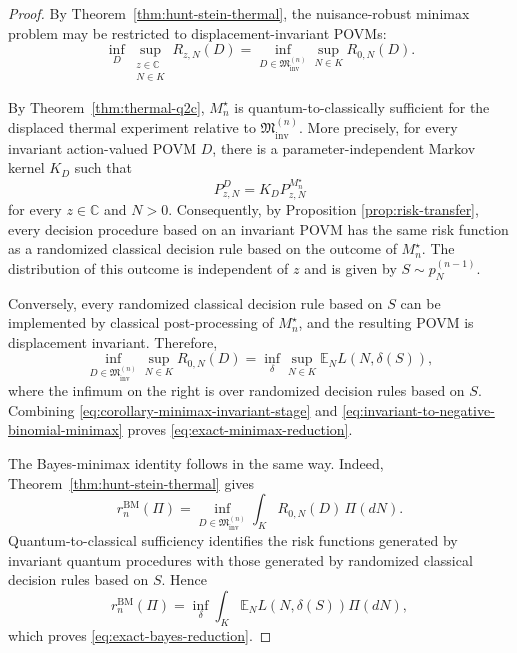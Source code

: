 \documentclass{article}
\theoremstyle{named}
\theoremstyle{named1}
\newcommand{\N}{\mathbb{N}}
\newcommand{\E}{\mathbb{E}}
\newcommand{\bbC}{\mathbb C}
\newcommand{\cM}{\mathfrak M}
\theoremstyle{plain}
\theoremstyle{remark}
\begin{document}
\begin{proof}
By Theorem~\ref{thm:hunt-stein-thermal}, the nuisance-robust minimax
problem may be restricted to displacement-invariant POVMs:
\begin{equation}
    \inf_D
    \sup_{\substack{z\in\bbC\\N\in K}}
    R_{z,N}(D)
    =
    \inf_{D\in\cM_{\mathrm{inv}}^{(n)}}
    \sup_{N\in K}
    R_{0,N}(D).
    \label{eq:corollary-minimax-invariant-stage}
\end{equation}

By Theorem~\ref{thm:thermal-q2c}, \(M_n^\star\) is
quantum-to-classically sufficient for the displaced thermal experiment
relative to \(\cM_{\mathrm{inv}}^{(n)}\). More precisely, for every
invariant action-valued POVM \(D\), there is a parameter-independent
Markov kernel \(K_D\) such that
\begin{equation}
    P_{z,N}^{D}
    =
    K_D P_{z,N}^{M_n^\star}
    \label{eq:thermal-risk-randomization}
\end{equation}
for every \(z\in\bbC\) and \(N>0\). Consequently, by Proposition \ref{prop:risk-transfer}, every decision
procedure based on an invariant POVM has the same risk function as a
randomized classical decision rule based on the outcome of \(M_n^\star\).
The distribution of this outcome is independent of \(z\) and is given by
$S\sim p_N^{(n-1)}.$


Conversely, every randomized classical decision rule based on \(S\) can
be implemented by classical post-processing of \(M_n^\star\), and the
resulting POVM is displacement invariant. Therefore,
\begin{equation}
    \inf_{D\in\cM_{\mathrm{inv}}^{(n)}}
    \sup_{N\in K}
    R_{0,N}(D)
    =
    \inf_{\delta}
    \sup_{N\in K}
    \E_N
    L\!\left(N,\delta(S)\right),
    \label{eq:invariant-to-negative-binomial-minimax}
\end{equation}
where the infimum on the right is over randomized decision rules based on
\(S\). Combining
\eqref{eq:corollary-minimax-invariant-stage} and
\eqref{eq:invariant-to-negative-binomial-minimax} proves
\eqref{eq:exact-minimax-reduction}.

The Bayes-minimax identity follows in the same way. Indeed,
Theorem~\ref{thm:hunt-stein-thermal} gives
\begin{equation}
    r_n^{\mathrm{BM}}(\Pi)
    =
    \inf_{D\in\cM_{\mathrm{inv}}^{(n)}}
    \int_K
        R_{0,N}(D)\,
        \Pi(dN).
    \label{eq:corollary-bayes-invariant-stage}
\end{equation}
Quantum-to-classical sufficiency identifies the risk functions generated
by invariant quantum procedures with those generated by randomized
classical decision rules based on \(S\). Hence
\begin{equation}
    r_n^{\mathrm{BM}}(\Pi)
    =
    \inf_{\delta}
    \int_K
        \E_N
        L\!\left(N,\delta(S)\right)
        \Pi(dN),
\end{equation}
which proves \eqref{eq:exact-bayes-reduction}.
\end{proof}
\end{document}
